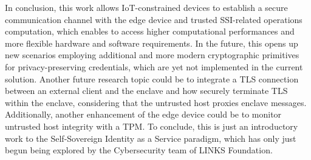 
In conclusion, this work allows IoT-constrained devices to establish a secure communication channel with the edge device and trusted SSI-related operations computation, which enables to access higher computational performances and more flexible hardware and software requirements. In the future, this opens up new scenarios employing additional and more modern cryptographic primitives for privacy-preserving credentials, which are yet not implemented in the current solution. 
Another future research topic could be to integrate a TLS connection between an external client and the enclave and how securely terminate TLS within the enclave, considering that the untrusted host proxies enclave messages. 
Additionally, another enhancement of the edge device could be to monitor untrusted host integrity with a TPM.
To conclude, this is just an introductory work to the Self-Sovereign Identity as a Service paradigm, which has only just begun being explored by the Cybersecurity team of LINKS Foundation.